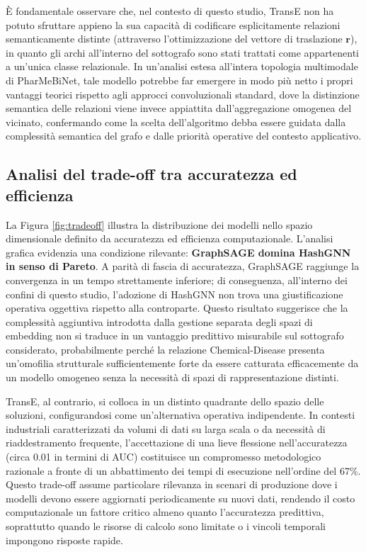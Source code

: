 È fondamentale osservare che, nel contesto di questo studio, TransE non ha potuto sfruttare appieno la sua capacità di codificare esplicitamente relazioni semanticamente distinte (attraverso l'ottimizzazione del vettore di traslazione $\mathbf{r}$), in quanto gli archi all'interno del sottografo sono stati trattati come appartenenti a un'unica classe relazionale. In un'analisi estesa all'intera topologia multimodale di PharMeBiNet, tale modello potrebbe far emergere in modo più netto i propri vantaggi teorici rispetto agli approcci convoluzionali standard, dove la distinzione semantica delle relazioni viene invece appiattita dall'aggregazione omogenea del vicinato, confermando come la scelta dell'algoritmo debba essere guidata dalla complessità semantica del grafo e dalle priorità operative del contesto applicativo.

\subsection{Analisi del trade-off tra accuratezza ed efficienza}
La Figura \ref{fig:tradeoff} illustra la distribuzione dei modelli nello spazio dimensionale definito da accuratezza ed efficienza computazionale. L'analisi grafica evidenzia una condizione rilevante: \textbf{GraphSAGE domina HashGNN in senso di Pareto}. A parità di fascia di accuratezza, GraphSAGE raggiunge la convergenza in un tempo strettamente inferiore; di conseguenza, all'interno dei confini di questo studio, l'adozione di HashGNN non trova una giustificazione operativa oggettiva rispetto alla controparte. Questo risultato suggerisce che la complessità aggiuntiva introdotta dalla gestione separata degli spazi di embedding non si traduce in un vantaggio predittivo misurabile sul sottografo considerato, probabilmente perché la relazione Chemical-Disease presenta un'omofilia strutturale sufficientemente forte da essere catturata efficacemente da un modello omogeneo senza la necessità di spazi di rappresentazione distinti.

TransE, al contrario, si colloca in un distinto quadrante dello spazio delle soluzioni, configurandosi come un'alternativa operativa indipendente. In contesti industriali caratterizzati da volumi di dati su larga scala o da necessità di riaddestramento frequente, l'accettazione di una lieve flessione nell'accuratezza (circa 0.01 in termini di AUC) costituisce un compromesso metodologico razionale a fronte di un abbattimento dei tempi di esecuzione nell'ordine del 67\%. Questo trade-off assume particolare rilevanza in scenari di produzione dove i modelli devono essere aggiornati periodicamente su nuovi dati, rendendo il costo computazionale un fattore critico almeno quanto l'accuratezza predittiva, soprattutto quando le risorse di calcolo sono limitate o i vincoli temporali impongono risposte rapide.


